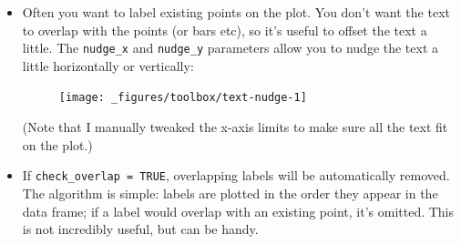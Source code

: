 \begin{itemize}
\item
  Often you want to label existing points on the plot. You don't want
  the text to overlap with the points (or bars etc), so it's useful to
  offset the text a little. The \texttt{nudge\_x} and \texttt{nudge\_y}
  parameters allow you to nudge the text a little horizontally or
  vertically:

\begin{Shaded}
\begin{Highlighting}[]
\StringTok{ }\NormalTok{(} \NormalTok{(}\NormalTok{, }\NormalTok{, }\NormalTok{), } \NormalTok{(}\NormalTok{, }\NormalTok{, }\NormalTok{))}
\StringTok{ }
\StringTok{  }\NormalTok{() +}\StringTok{ }
\StringTok{  }\NormalTok{(}\NormalTok{(} \NormalTok{(}\NormalTok{)), } \NormalTok{-}\NormalTok{) +}\StringTok{ }
\StringTok{  }\NormalTok{(}\NormalTok{, }\NormalTok{)}
\end{Highlighting}
\end{Shaded}

  \begin{figure}[H]
    \texttt{[image: \_figures/toolbox/text-nudge-1]}
  \end{figure}

  (Note that I manually tweaked the x-axis limits to make sure all the
  text fit on the plot.)
\item
  If \texttt{check\_overlap\ =\ TRUE}, overlapping labels will be
  automatically removed. The algorithm is simple: labels are plotted in
  the order they appear in the data frame; if a label would overlap with
  an existing point, it's omitted. This is not incredibly useful, but
  can be handy. 

\begin{Shaded}
\begin{Highlighting}[]
\StringTok{ }
\StringTok{  }\NormalTok{(}\NormalTok{(} \StringTok{ }
\StringTok{  }\NormalTok{(}\NormalTok{, }\NormalTok{)}
\StringTok{ }
\StringTok{  }\NormalTok{(}\NormalTok{(}  \NormalTok{) +}\StringTok{ }
\StringTok{  }\NormalTok{(}\NormalTok{, }\NormalTok{)}
\end{Highlighting}
\end{Shaded}


\end{itemize}

